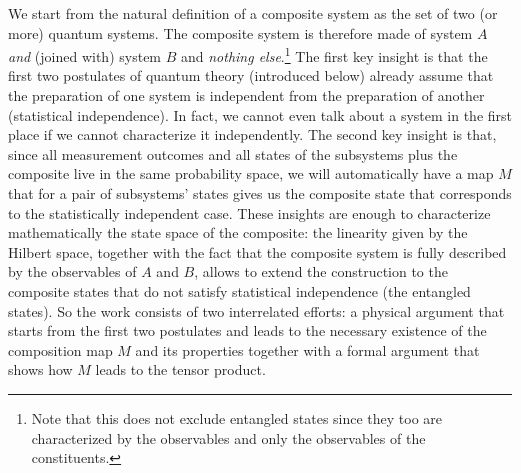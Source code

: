 \documentclass[aps,prl,amsmath,amssymb,twocolumn]{revtex4}
\theoremstyle{plain}
\theoremstyle{definition}
\theoremstyle{remark}
\def\comment#1{}
\begin{document}
	We start
	from the natural definition of a composite system as the set of two
	(or more) quantum systems. The composite system is therefore
	made of system $A$ {\em and} (joined with) system $B$ and {\em nothing else}.\footnote{Note that this does not exclude entangled states since they too are characterized by the observables and only the observables of the constituents.} The first key insight is that the first two postulates of quantum theory (introduced below) already assume that the preparation of one system is independent from the preparation of another (statistical independence). In fact, we cannot even talk about a system in the first place if we cannot characterize it independently. The second key insight is that, since all measurement
	outcomes and all states of the subsystems plus the composite live in the same probability space, we will automatically have a map $M$ that for a pair of subsystems' states gives us the composite state that corresponds to the statistically independent case. These insights are enough to characterize mathematically the state space of the composite: the linearity given by the Hilbert space, together with the fact that the composite system is fully described by the observables of $A$ and $B$, allows to extend the construction to the composite states that do not satisfy statistical independence (the entangled states). So the work consists of two interrelated efforts: a physical argument that starts from the first two postulates and leads to the necessary existence of the composition map $M$ and its properties together with a formal argument that shows how $M$ leads to the tensor product.
	
	\comment{mettere nel supplementary:	We will mainly focus on
		kine\-mati\-cal\-ly-inde\-pen\-dent systems, namely no superselection rules or
		other restrictions to the state space are present: it is possible to
		prepare each subsystem of a composite system in a state that is
		independent of the other systems (preparation independence).  This is
		the only case in which the tensor product can be properly employed: the Hilbert space of composite
		systems that have restrictions is {\em not} the tensor product of the
		component spaces, but a subspace of it (e.g.~the anti-symmetric
		subspace for fermions). Typically this is ignored in the literature,
		since the tensor product formalism is very convenient and is often
		used also in these cases, and superselection rules are typically avoidable \cite{susskind,zanardi,zanardilloyd}. }
	
\end{document}

